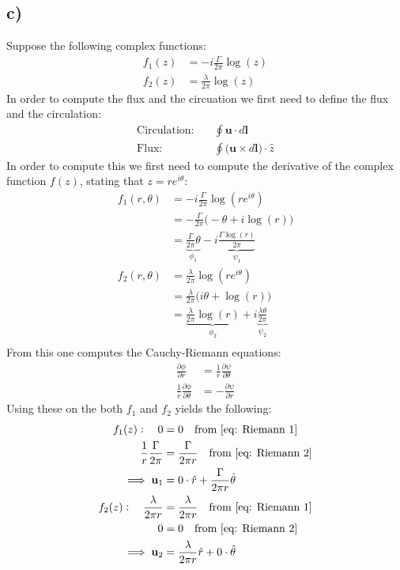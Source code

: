 \documentclass{article}
\begin{document}
\subsection*{c)}
Suppose the following complex functions:
\begin{align}
    f_1(z) &= -i\frac{\Gamma}{2\pi}\log(z)\label{eq: task 3c 1}\\
    f_2(z) &= \frac{\lambda}{2\pi}\log(z)\label{eq: task 3c 2}
\end{align}
In order to compute the flux and the circuation we first need to define the flux and the circulation:
\begin{align*}
   \text{Circulation:}& \quad \oint \mathbf{u}\cdot d\mathbf{l}\\
    \text{Flux:}& \quad \oint \Big(\mathbf{u}\times d\mathbf{l}\Big)\cdot\hat{z}
\end{align*}
In order to compute this we first need to compute the derivative of the complex function $f(z)$, stating that $ z =r e^{i\theta}$:
\begin{align*}
    f_1(r, \theta) &= -i\frac{\Gamma}{2\pi}\log(re^{i\theta})\\
    &=-\frac{\Gamma}{2\pi}\Big(-\theta + i\log(r)\Big)\\
    &=\underbrace{\frac{\Gamma}{2\pi}\theta}_{\phi_1} - i\underbrace{\frac{\Gamma\log(r)}{2\pi}}_{\psi_1}\\
    f_2(r, \theta) &= \frac{\lambda}{2\pi}\log(re^{i\theta})\\
    &=\frac{\lambda}{2\pi}\Big(i\theta + \log(r)\Big)\\
    &=\underbrace{\frac{\lambda}{2\pi}\log(r)}_{\phi_2} + i\underbrace{\frac{\lambda \theta}{2\pi}}_{\psi_2}\\
\end{align*}From this one computes the Cauchy-Riemann equations:
\begin{align}
    \frac{\partial \phi}{\partial r} &= \frac{1}{r}\frac{\partial \psi}{\partial \theta}\label{eq: Riemann 1}\\
    \frac{1}{r}\frac{\partial \phi}{\partial\theta} &= -\frac{\partial \psi}{\partial r}\label{eq: Riemann 2}
\end{align}Using these on the both $f_1$ and $f_2$ yields the following:
\begin{align*}
    f_1(z): \quad 0 &= 0\quad \text{from \eqref{eq: Riemann 1}}\\
    \frac{1}{r}\frac{\Gamma}{2\pi}&=\frac{\Gamma}{2\pi r}\quad \text{from \eqref{eq: Riemann 2}}\\
    \implies \mathbf{u}_1 &= 0\cdot\hat{r} +  \frac{\Gamma}{2\pi r}\hat{\theta}\\
    f_2(z): \quad \frac{\lambda}{2\pi r} &= \frac{\lambda}{2\pi r}\quad \text{from \eqref{eq: Riemann 1}}\\
    0&=0\quad \text{from \eqref{eq: Riemann 2}}\\
    \implies \mathbf{u}_2 &= \frac{\lambda}{2\pi r}\hat{r} + 0\cdot\hat{\theta}
\end{align*}
\end{document}
